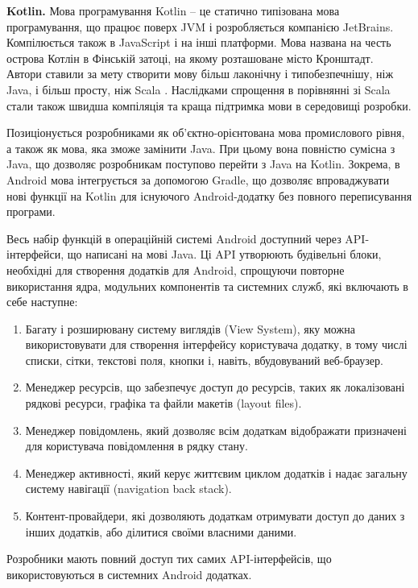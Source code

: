 \documentclass[../main.tex]{subfiles}
\begin{document}
\textbf{Kotlin.}
Мова програмування Kotlin -- це статично типізована мова програмування, що працює поверх JVM і розробляється компанією JetBrains. Компілюється також в JavaScript і на інші платформи. Мова названа на честь острова Котлін в Фінській затоці, на якому розташоване місто Кронштадт. Автори ставили за мету створити мову більш лаконічну і типобезпечнішу, ніж Java, і більш просту, ніж Scala \cite{open_systems}. Наслідками спрощення в порівнянні зі Scala стали також швидша компіляція та краща підтримка мови в середовищі розробки.

Позиціонується розробниками як об'єктно-орієнтована мова промислового рівня, а також як мова, яка зможе замінити Java. При цьому вона повністю сумісна з Java, що дозволяє розробникам поступово перейти з Java на Kotlin. Зокрема, в Android мова інтегрується за допомогою Gradle, що дозволяє впроваджувати нові функції на Kotlin для існуючого Android-додатку без повного переписування програми.


Весь набір функцій в операційній системі Android доступний через API-інтерфейси, що написані на мові Java. Ці API утворюють будівельні блоки, необхідні для створення додатків для Android, спрощуючи повторне використання ядра, модульних компонентів та системних служб, які включають в себе наступне:

\begin{enumerate}
	\item Багату і розширювану систему виглядів (View System), яку можна використовувати для створення інтерфейсу користувача додатку, в тому числі списки, сітки, текстові поля, кнопки і, навіть, вбудовуваний веб-браузер.
	\item Менеджер ресурсів, що забезпечує доступ до ресурсів, таких як локалізовані рядкові ресурси, графіка та файли макетів (layout files).
	\item Менеджер повідомлень, який дозволяє всім додаткам відображати призначені для користувача повідомлення в рядку стану.
	\item Менеджер активності, який керує життєвим циклом додатків і надає загальну систему навігації (navigation back stack).
	\item Контент-провайдери, які дозволяють додаткам отримувати доступ до даних з інших додатків, або ділитися своїми власними даними.
\end{enumerate}

Розробники мають повний доступ тих самих API-інтерфейсів, що використовуються в системних Android додатках.
\end{document}
